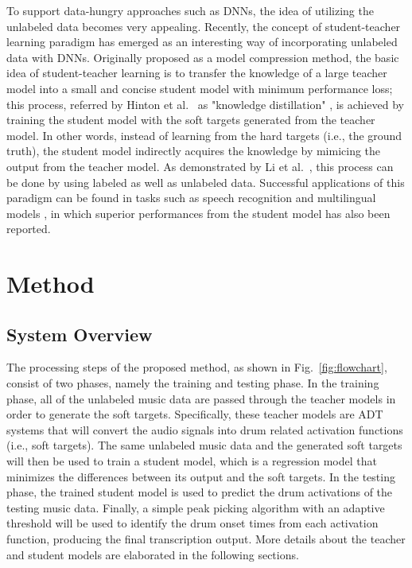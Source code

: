 \documentclass{article}
\begin{document}
To support data-hungry approaches such as DNNs, the idea of utilizing the unlabeled data becomes very appealing. Recently, the concept of student-teacher learning paradigm has emerged as an interesting way of incorporating unlabeled data with DNNs. Originally proposed as a model compression method, the basic idea of student-teacher learning is to transfer the knowledge of a large teacher model into a small and concise student model with minimum performance loss; this process, referred by Hinton et al.~ as "knowledge distillation" \cite{Hinton2015}, is achieved by training the student model with the soft targets generated from the teacher model. In other words, instead of learning from the hard targets (i.e., the ground truth), the student model indirectly acquires the knowledge by mimicing the output from the teacher model. As demonstrated by Li et al.~\cite{Li2014}, this process can be done by using labeled as well as unlabeled data. Successful applications of this paradigm can be found in tasks such as speech recognition \cite{Watanabe2017} and multilingual models \cite{Cui2017}, in which superior performances from the student model has also been reported.

\section{Method}\label{sec:method}
\subsection{System Overview}
The processing steps of the proposed method, as shown in Fig.~\ref{fig:flowchart}, consist of two phases, namely the training and testing phase. In the training phase, all of the unlabeled music data are passed through the teacher models in order to generate the soft targets. Specifically, these teacher models are ADT systems that will convert the audio signals into drum related activation functions (i.e., soft targets). The same unlabeled music data and the generated soft targets will then be used to train a student model, which is a regression model that minimizes the differences between its output and the soft targets. In the testing phase, the trained student model is used to predict the drum activations of the testing music data. Finally, a simple peak picking algorithm with an adaptive threshold will be used to identify the drum onset times from each activation function, producing the final transcription output. More details about the teacher and student models are elaborated in the following sections.  
\end{document}
